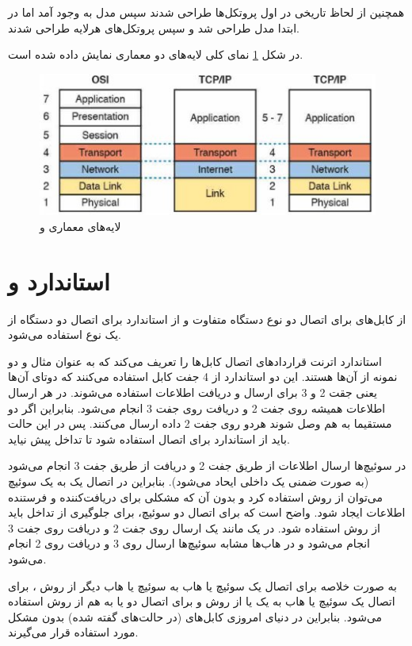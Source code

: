 \documentclass{article}
\begin{document}
همچنین از لحاظ تاریخی در  اول پروتکل‌ها طراحی شدند سپس مدل به وجود آمد اما در  ابتدا مدل طراحی شد و سپس پروتکل‌های هرلایه طراحی شدند.

\newpage

در شکل \ref{fig:layers} نمای کلی لایه‌های دو معماری نمایش داده شده است. 
\begin{figure}[h]
	\centering
	\includegraphics[width=0.6\columnwidth]{figs/osi-tcpip.jpg}
	\caption{لایه‌های معماری  و }
	\label{fig:layers}
\end{figure}

\section{استاندارد  و }
از کابل‌های  برای اتصال دو نوع دستگاه متفاوت و از استاندارد  برای اتصال دو دستگاه از یک نوع استفاده می‌شود.

استاندارد اترنت  قراردادهای اتصال کابل‌ها را تعریف می‌کند که به عنوان مثال  و  دو نمونه از آن‌ها هستند. این دو استاندارد از 4 جفت کابل  استفاده می‌کنند که دوتای آن‌ها یعنی جقت 2 و 3 برای ارسال و دریافت اطلاعات استفاده می‌شوند.
 در هر  ارسال اطلاعات همیشه روی جفت 2 و دریافت روی جفت 3 انجام می‌شود. بنابراین اگر دو  مستقیما به هم وصل شوند هردو روی جفت 2 داده ارسال می‌کنند. پس در این حالت باید از استاندارد  برای اتصال استفاده شود تا تداخل پیش نیاید.
 
 در سوئیچ‌ها ارسال اطلاعات از طریق جفت 2 و دریافت از طریق جفت 3 انجام می‌شود (به صورت ضمنی یک  داخلی ایحاد می‌شود). بنابراین در اتصال یک  به یک سوئیچ می‌توان از روش  استفاده کرد و بدون آن که مشکلی برای دریافت‌کننده و فرستنده اطلاعات ایجاد شود.
 واضح است که برای اتصال دو سوئیچ، برای جلوگیری از تداخل باید از روش  استفاده شود.
 در یک  مانند یک  ارسال روی جفت 2 و دریافت روی جفت 3 انجام می‌شود و در هاب‌ها مشابه سوئیچ‌ها ارسال روی 3 و دریافت روی 2 انجام می‌شود.
 
 به صورت خلاصه برای اتصال یک سوئیچ یا هاب به سوئیچ یا هاب دیگر از روش ، برای اتصال یک سوئیچ یا هاب به یک  یا  از روش  و برای اتصال دو  یا  به هم از روش  استفاده می‌شود.
 بنابراین در دنیای امروزی کابل‌های  (در حالت‌های گفته شده) بدون مشکل مورد استفاده قرار می‌گیرند.  
\end{document}
